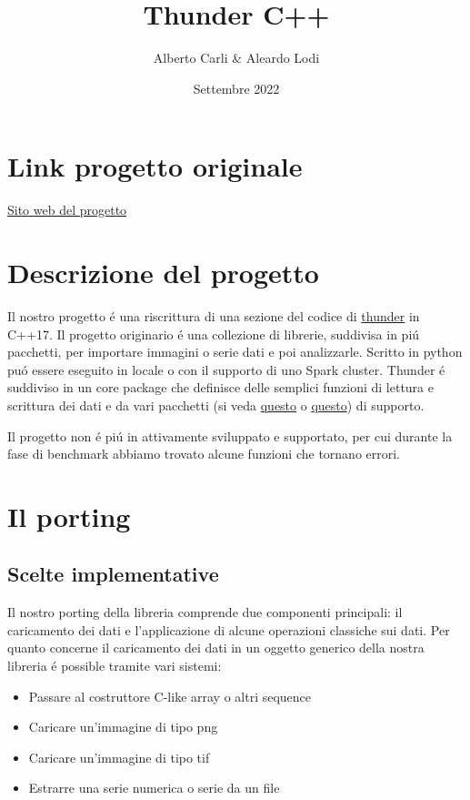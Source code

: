 \documentclass{article}
\title{Thunder C++}
\author{Alberto Carli & Aleardo Lodi}
\date{Settembre 2022}
\begin{document}
\maketitle

\section{Link progetto originale}

\href{http://thunder-project.org/}{
Sito web del progetto}


\section{Descrizione del progetto}
Il nostro progetto é una riscrittura di una sezione del codice di \href{https://github.com/thunder-project/thunder}{thunder} in C++17.
Il progetto originario é una collezione di librerie, suddivisa in piú pacchetti, per importare immagini o serie dati e poi analizzarle.
Scritto in python puó essere eseguito in locale o con il supporto di uno Spark cluster.
Thunder é suddiviso in un core package che definisce delle semplici funzioni di lettura e scrittura dei dati e da vari pacchetti (si veda \href{https://github.com/thunder-project/thunder-regression}{questo} o \href{https://github.com/thunder-project/thunder-registration}{questo}) di supporto.

Il progetto non é piú in attivamente sviluppato e supportato, per cui durante la fase di benchmark abbiamo trovato alcune funzioni che tornano errori.


\section{Il porting}
\subsection{Scelte implementative}
Il nostro porting della libreria comprende due componenti principali: il caricamento dei dati e l'applicazione di alcune operazioni classiche sui dati.
Per quanto concerne il caricamento dei dati in un oggetto generico della nostra libreria é possible tramite vari sistemi:
\begin{itemize}
  \item Passare al costruttore C-like array o altri sequence
  \item Caricare un'immagine di tipo png
  \item Caricare un'immagine di tipo tif
  \item Estrarre una serie numerica o serie da un file
\end{itemize}
\end{document}
